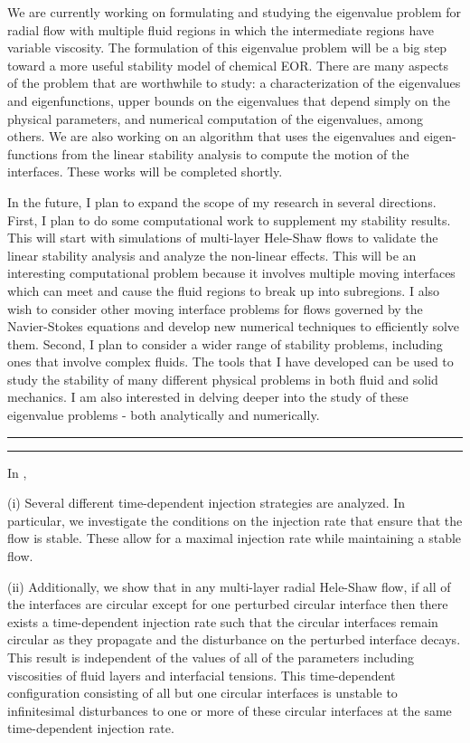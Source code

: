 \documentclass[10pt]{article}
\begin{document}
We are currently working on formulating and studying the eigenvalue problem for radial flow with multiple fluid regions in which the intermediate regions have variable viscosity. The formulation of this eigenvalue problem will be a big step toward a more useful stability model of chemical EOR. There are many aspects of the problem that are worthwhile to study: a characterization of the eigenvalues and eigenfunctions, upper bounds on the eigenvalues that depend simply on the physical parameters, and numerical computation of the eigenvalues, among others. We are also working on an algorithm that uses the eigenvalues and eigen- functions from the linear stability analysis to compute the motion of the interfaces. These works will be completed shortly.

In the future, I plan to expand the scope of my research in several directions. First, I plan to do some computational work to supplement my stability results. This will start with simulations of multi-layer Hele-Shaw flows to validate the linear stability analysis and analyze the non-linear effects. This will be an interesting computational problem because it involves multiple moving interfaces which can meet and cause the fluid regions to break up into subregions. I also wish to consider other moving interface problems for flows governed by the Navier-Stokes equations and develop new numerical techniques to efficiently solve them. Second, I plan to consider a wider range of stability problems, including ones that involve complex fluids. The tools that I have developed can be used to study the stability of many different physical problems in both fluid and solid mechanics. I am also interested in delving deeper into the study of these eigenvalue problems - both analytically and numerically.
\bigskip\hrule\hrule\bigskip


In \cite{gin-daripa:hs-timedependent}, 

(i) Several different time-dependent injection strategies are analyzed. In particular, we investigate the conditions on the injection rate that ensure that the flow is stable. These allow for a maximal injection rate while maintaining a stable flow.

(ii) Additionally, we show that in any multi-layer radial Hele-Shaw flow, if all of the interfaces are circular except for one perturbed circular interface then there exists a time-dependent injection rate such that the circular interfaces remain circular as they propagate and the disturbance on the perturbed interface decays. This result is independent of the values of all of the parameters including viscosities of fluid layers and interfacial tensions. This time-dependent configuration consisting of all but one circular interfaces is unstable to infinitesimal disturbances to one or more of these circular interfaces at the same time-dependent injection rate. 
\end{document}
